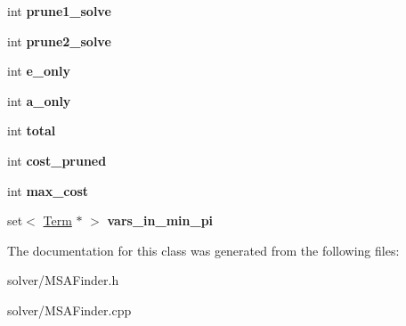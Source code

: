 \begin{DoxyCompactItemize}
\item 
\hypertarget{classMSAFinder_a1c83e8e87c58558da27167916c89abf4}{int {\bfseries prune1\-\_\-solve}}\label{classMSAFinder_a1c83e8e87c58558da27167916c89abf4}

\item 
\hypertarget{classMSAFinder_a169289fa1519ad78fbd4c2e112cfa844}{int {\bfseries prune2\-\_\-solve}}\label{classMSAFinder_a169289fa1519ad78fbd4c2e112cfa844}

\item 
\hypertarget{classMSAFinder_aed6453abcfd412a1013cb7cea46c501c}{int {\bfseries e\-\_\-only}}\label{classMSAFinder_aed6453abcfd412a1013cb7cea46c501c}

\item 
\hypertarget{classMSAFinder_a6558a1c7b4874e5ce07344dd440ebe97}{int {\bfseries a\-\_\-only}}\label{classMSAFinder_a6558a1c7b4874e5ce07344dd440ebe97}

\item 
\hypertarget{classMSAFinder_aef3c091db425df97637b9480e17aac55}{int {\bfseries total}}\label{classMSAFinder_aef3c091db425df97637b9480e17aac55}

\item 
\hypertarget{classMSAFinder_aa61506b9343333d49263a7780c71393d}{int {\bfseries cost\-\_\-pruned}}\label{classMSAFinder_aa61506b9343333d49263a7780c71393d}

\item 
\hypertarget{classMSAFinder_ac680e97f6d2e20bab5a4d7711727869d}{int {\bfseries max\-\_\-cost}}\label{classMSAFinder_ac680e97f6d2e20bab5a4d7711727869d}

\item 
\hypertarget{classMSAFinder_aaf89914b503c4b2f9390e2c02f05a667}{set$<$ \hyperlink{classTerm}{\-Term} $\ast$ $>$ {\bfseries vars\-\_\-in\-\_\-min\-\_\-pi}}\label{classMSAFinder_aaf89914b503c4b2f9390e2c02f05a667}

\end{DoxyCompactItemize}


\-The documentation for this class was generated from the following files\-:\begin{DoxyCompactItemize}
\item 
solver/\-M\-S\-A\-Finder.\-h\item 
solver/\-M\-S\-A\-Finder.\-cpp\end{DoxyCompactItemize}
